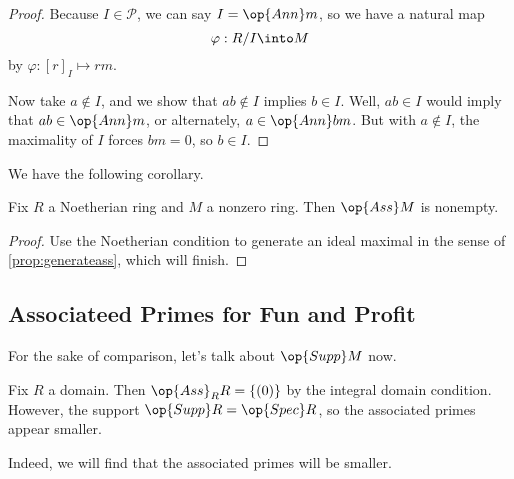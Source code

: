 \begin{proof}
	Because $I\in\mathcal P$, we can say $I=\op{Ann}m$, so we have a natural map
	\[\varphi:R/I\into M\]
	by $\varphi:[r]_I\mapsto rm$.

	Now take $a\notin I$, and we show that $ab\notin I$ implies $b\in I$. Well, $ab\in I$ would imply that $ab\in\op{Ann}m$, or alternately, $a\in\op{Ann}bm$. But with $a\notin I$, the maximality of $I$ forces $bm=0$, so $b\in I$.
\end{proof}
We have the following corollary.
\begin{corollary}
	Fix $R$ a Noetherian ring and $M$ a nonzero ring. Then $\op{Ass}M$ is nonempty.
\end{corollary}
\begin{proof}
	Use the Noetherian condition to generate an ideal maximal in the sense of \autoref{prop:generateass}, which will finish.
\end{proof}

\subsection{Associateed Primes for Fun and Profit}
For the sake of comparison, let's talk about $\op{Supp}M$ now.
\begin{example}
	Fix $R$ a domain. Then $\op{Ass}_RR=\{(0)\}$ by the integral domain condition. However, the support $\op{Supp}R=\op{Spec}R$, so the associated primes appear smaller.
\end{example}
Indeed, we will find that the associated primes will be smaller.

